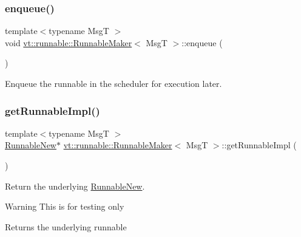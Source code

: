 \subsubsection{\texorpdfstring{enqueue()}{enqueue()}}
{\footnotesize\ttfamily template$<$typename MsgT $>$ \\
void \hyperlink{structvt_1_1runnable_1_1_runnable_maker}{vt\+::runnable\+::\+Runnable\+Maker}$<$ MsgT $>$\+::enqueue (\begin{DoxyParamCaption}{ }\end{DoxyParamCaption})}



Enqueue the runnable in the scheduler for execution later. 

\mbox{\label{structvt_1_1runnable_1_1_runnable_maker_accd2b512108a1ac1e686bc25791c2e5f}} 
\subsubsection{\texorpdfstring{get\+Runnable\+Impl()}{getRunnableImpl()}}
{\footnotesize\ttfamily template$<$typename MsgT $>$ \\
\hyperlink{structvt_1_1runnable_1_1_runnable_new}{Runnable\+New}$\ast$ \hyperlink{structvt_1_1runnable_1_1_runnable_maker}{vt\+::runnable\+::\+Runnable\+Maker}$<$ MsgT $>$\+::get\+Runnable\+Impl (\begin{DoxyParamCaption}{ }\end{DoxyParamCaption})\hspace{0.3cm}{\ttfamily [inline]}}



Return the underlying {\ttfamily \hyperlink{structvt_1_1runnable_1_1_runnable_new}{Runnable\+New}}. 

\begin{DoxyWarning}{Warning}
This is for testing only
\end{DoxyWarning}
\begin{DoxyReturn}{Returns}
the underlying runnable 
\end{DoxyReturn}
\mbox{\label{structvt_1_1runnable_1_1_runnable_maker_a8fb3e1362dd6f746e991786654f5bd40}} 
